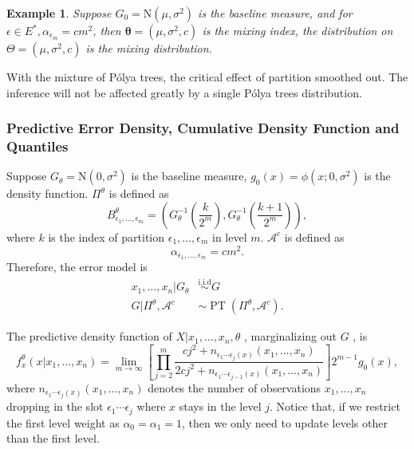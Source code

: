 \documentclass[12pt]{article}
\newtheorem{emp}[thm]{Example}
\newcommand{\polya}{P\'{o}lya}
\newcommand{\iid}{\stackrel{\text{i.i.d}}{\sim}}
\DeclareMathOperator{\pt}{PT}
\begin{document}
\begin{emp}
Suppose $G_0 = \mathrm{N}(\mu, \sigma^2)$ is the baseline measure, and
for $\epsilon \in E^{*}, \alpha_{\epsilon_m} = cm^2 $, then
$\bm{\theta}= (\mu, \sigma^2, c)$ is the mixing index, the
distribution on $\Theta = (\mu, \sigma^2, c) $ is the mixing
distribution. 
\end{emp}
With the mixture of \polya{} trees, the critical effect of partition
smoothed out. The inference will not be affected greatly by a single
\polya{} trees distribution. 

\subsubsection{Predictive Error Density, Cumulative Density Function
  and Quantiles}
Suppose $G_{\theta} = \mathrm{N}(0, \sigma^2)$ is the baseline
measure, $g_0(x) = \phi(x; 0, \sigma^2)$ is the density
function. $\Pi^{\theta}$ is defined as
\begin{displaymath}
B^{\theta}_{\epsilon_1, \ldots, \epsilon_m} = \left( G^{-1}_{\theta}
  \left( \frac{k}{2^m} \right) , G^{-1}_{\theta}\left( \frac{k+1}{2^m} \right) \right),
\end{displaymath}
where $k$ is the index of partition $\epsilon_1, \ldots, \epsilon_m$
in level $m$. $\mathcal{A}^c$ is defined as 
\begin{displaymath}
\alpha_{\epsilon_1, \ldots, \epsilon_m} = cm^2.
\end{displaymath}
Therefore, the error model is 
\begin{align*}
x_1, \ldots, x_n |G_{\theta} & \iid G\\
G|\Pi^{\theta}, \mathcal{A}^{c} & \sim \pt (\Pi^{\theta},
\mathcal{A}^{c}). 
\end{align*}

The predictive density function of $X|x_1, \ldots, x_n, \theta$ ,
marginalizing out $G$ , is  
\begin{equation}
\label{eq:4}
f_x^{\theta} (x|x_1, \ldots, x_n)  = \lim_{m \to \infty} \left[
  \prod_{j=2}^m \frac{cj^2 + n_{\epsilon_1 \cdots \epsilon_j(x) }(x_1 , \ldots, x_n)}{2cj^2
  + n_{\epsilon_1 \cdots \epsilon_{j-1}(x)}(x_1, \ldots, x_n)}
\right]2^{m-1} g_0(x),
\end{equation}
where $n_{\epsilon_1 \cdots \epsilon_j(x) }(x_1 , \ldots, x_n)$
denotes the number of observations $x_1, \ldots, x_n$ dropping in the
slot $\epsilon_1 \cdots \epsilon_j$ where $x$ stays in the level
$j$. Notice that, if  we restrict the first level weight as
$\alpha_0=\alpha_1=1$, then we only need to update levels other than
the first level.
\end{document}
